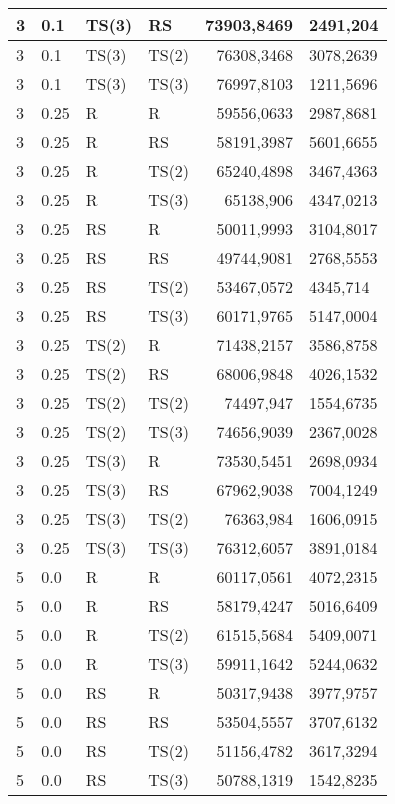 \documentclass[twoside]{iisthesis}
\begin{document}
\begin{center}
\begin{longtable}{|l|l|l|l|r@{$\pm$}l|}
		3 & 0.1 & TS(3) & RS & 73903,8469 & 2491,204\\ \hline
		3 & 0.1 & TS(3) & TS(2) & 76308,3468 & 3078,2639\\ \hline
		3 & 0.1 & TS(3) & TS(3) & 76997,8103 & 1211,5696\\ \hline
		3 & 0.25 & R & R & 59556,0633 & 2987,8681\\ \hline
		3 & 0.25 & R & RS & 58191,3987 & 5601,6655\\ \hline
		3 & 0.25 & R & TS(2) & 65240,4898 & 3467,4363\\ \hline
		3 & 0.25 & R & TS(3) & 65138,906 & 4347,0213\\ \hline
		3 & 0.25 & RS & R & 50011,9993 & 3104,8017\\ \hline
		3 & 0.25 & RS & RS & 49744,9081 & 2768,5553\\ \hline
		3 & 0.25 & RS & TS(2) & 53467,0572 & 4345,714\\ \hline
		3 & 0.25 & RS & TS(3) & 60171,9765 & 5147,0004\\ \hline
		3 & 0.25 & TS(2) & R & 71438,2157 & 3586,8758\\ \hline
		3 & 0.25 & TS(2) & RS & 68006,9848 & 4026,1532\\ \hline
		3 & 0.25 & TS(2) & TS(2) & 74497,947 & 1554,6735\\ \hline
		3 & 0.25 & TS(2) & TS(3) & 74656,9039 & 2367,0028\\ \hline
		3 & 0.25 & TS(3) & R & 73530,5451 & 2698,0934\\ \hline
		3 & 0.25 & TS(3) & RS & 67962,9038 & 7004,1249\\ \hline
		3 & 0.25 & TS(3) & TS(2) & 76363,984 & 1606,0915\\ \hline
		3 & 0.25 & TS(3) & TS(3) & 76312,6057 & 3891,0184\\ \hline
		5 & 0.0 & R & R & 60117,0561 & 4072,2315\\ \hline
		5 & 0.0 & R & RS & 58179,4247 & 5016,6409\\ \hline
		5 & 0.0 & R & TS(2) & 61515,5684 & 5409,0071\\ \hline
		5 & 0.0 & R & TS(3) & 59911,1642 & 5244,0632\\ \hline
		5 & 0.0 & RS & R & 50317,9438 & 3977,9757\\ \hline
		5 & 0.0 & RS & RS & 53504,5557 & 3707,6132\\ \hline
		5 & 0.0 & RS & TS(2) & 51156,4782 & 3617,3294\\ \hline
		5 & 0.0 & RS & TS(3) & 50788,1319 & 1542,8235\\ \hline

\end{longtable}
\end{center}
\end{document}
